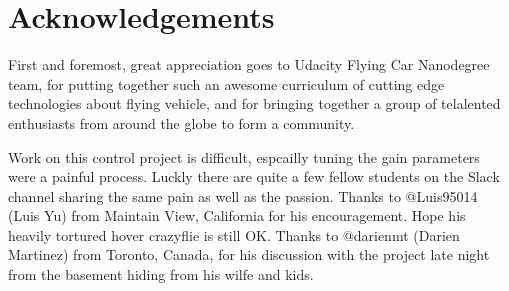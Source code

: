 \documentclass[letterpaper]{article}
\begin{document}
\section*{Acknowledgements}

First and foremost, great appreciation goes to Udacity Flying Car Nanodegree team, for putting together such an awesome curriculum of cutting edge technologies about flying vehicle, and for bringing together a group of telalented enthusiasts from around the globe to form a community.

Work on this control project is difficult, espcailly tuning the gain parameters were a painful process. Luckly there are quite a few fellow students on the Slack channel sharing the same pain as well as the passion. Thanks to @Luis95014 (Luis Yu) from Maintain View, California for his encouragement. Hope his heavily tortured hover crazyflie is still OK.  Thanks to @darienmt (Darien Martinez) from Toronto, Canada, for his discussion with the project late night from the basement hiding from his wilfe and kids.
\end{document}
